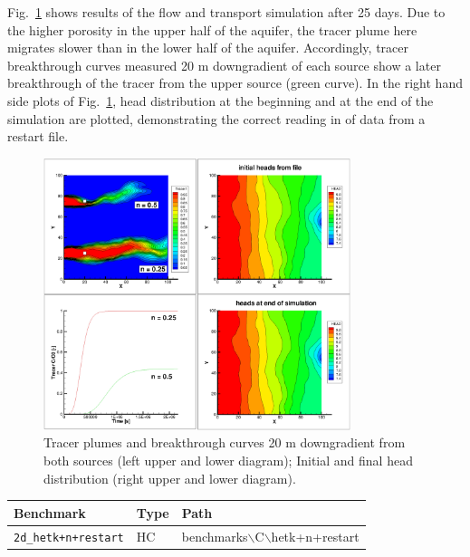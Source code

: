 Fig.~\ref{hetK_N_RFR} shows results of the flow and transport simulation after 25 days. Due to the higher porosity in the upper half of the aquifer, the tracer plume here migrates slower than in the lower half of the aquifer. Accordingly, tracer breakthrough curves measured 20 m downgradient of each source show a later breakthrough of the tracer from the upper source (green curve). In the right hand side plots of Fig.~\ref{hetK_N_RFR}, head distribution at the beginning and at the end of the simulation are plotted, demonstrating the correct reading in of data from a restart file.


\begin{figure}[htbp]
\centering
\includegraphics[width=0.8\textwidth]{C/figures/2d_hetKNRFR.eps}
\caption{Tracer plumes and breakthrough curves 20 m downgradient from both sources (left upper and lower diagram); Initial and final head distribution (right upper and lower diagram).}
\label{hetK_N_RFR}
\end{figure}



\begin{table}[htbp]
\centering
\begin{tabular}{|l|l|l|}
\hline
Benchmark & Type & Path \\
\hline
\texttt{2d\_hetk+n+restart}& HC &  benchmarks$\backslash$C$\backslash$hetk+n+restart  \\			
\hline
\end{tabular}
\end{table}

